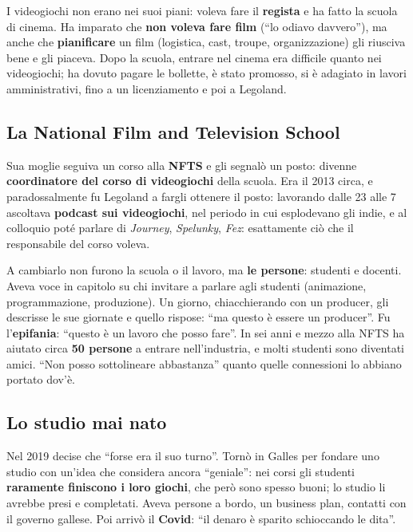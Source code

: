 I videogiochi non erano nei suoi piani: voleva fare il \textbf{regista} e ha fatto
la scuola di cinema. Ha imparato che \textbf{non voleva fare film} (``lo odiavo
davvero''), ma anche che \textbf{pianificare} un film (logistica, cast, troupe,
organizzazione) gli riusciva bene e gli piaceva. Dopo la scuola, entrare nel cinema
era difficile quanto nei videogiochi; ha dovuto pagare le bollette, è stato
promosso, si è adagiato in lavori amministrativi, fino a un licenziamento e poi a
Legoland.

\subsection{La National Film and Television School}

Sua moglie seguiva un corso alla \textbf{NFTS} e gli segnalò un posto: divenne
\textbf{coordinatore del corso di videogiochi} della scuola. Era il 2013 circa, e
paradossalmente fu Legoland a fargli ottenere il posto: lavorando dalle 23 alle 7
ascoltava \textbf{podcast sui videogiochi}, nel periodo in cui esplodevano gli
indie, e al colloquio poté parlare di \emph{Journey}, \emph{Spelunky}, \emph{Fez}:
esattamente ciò che il responsabile del corso voleva.

A cambiarlo non furono la scuola o il lavoro, ma \textbf{le persone}: studenti e
docenti. Aveva voce in capitolo su chi invitare a parlare agli studenti
(animazione, programmazione, produzione). Un giorno, chiacchierando con un
producer, gli descrisse le sue giornate e quello rispose: ``ma questo è essere un
producer''. Fu l'\textbf{epifania}: ``questo è un lavoro che posso fare''. In sei
anni e mezzo alla NFTS ha aiutato circa \textbf{50 persone} a entrare
nell'industria, e molti studenti sono diventati amici. ``Non posso sottolineare
abbastanza'' quanto quelle connessioni lo abbiano portato dov'è.

\subsection{Lo studio mai nato}

Nel 2019 decise che ``forse era il suo turno''. Tornò in Galles per fondare uno
studio con un'idea che considera ancora ``geniale'': nei corsi gli studenti
\textbf{raramente finiscono i loro giochi}, che però sono spesso buoni; lo studio
li avrebbe presi e completati. Aveva persone a bordo, un business plan, contatti
con il governo gallese. Poi arrivò il \textbf{Covid}: ``il denaro è sparito
schioccando le dita''.


